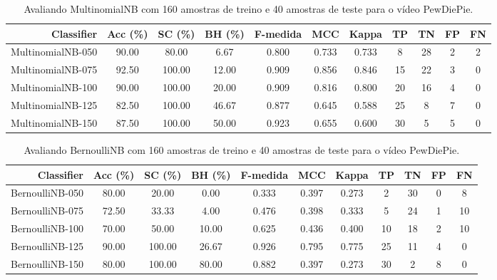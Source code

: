\begin{table}[!htb]
\centering
\caption{Avaliando MultinomialNB com 160 amostras de treino e 40 amostras de teste para o vídeo PewDiePie.}
\label{tab:multinomial-nb-PewDiePie}
\begin{tabular}{r|c|c|c|c|c|c|c|c|c|c}
\hline\hline
Classifier & Acc (\%) & SC (\%) & BH (\%) & F-medida & MCC & Kappa & TP & TN & FP & FN \\ \hline
MultinomialNB-050 & 90.00 & 80.00 & 6.67 & 0.800 & 0.733 & 0.733 & 8 & 28 & 2 & 2 \\ 
MultinomialNB-075 & 92.50 & 100.00 & 12.00 & 0.909 & 0.856 & 0.846 & 15 & 22 & 3 & 0 \\ 
MultinomialNB-100 & 90.00 & 100.00 & 20.00 & 0.909 & 0.816 & 0.800 & 20 & 16 & 4 & 0 \\ 
MultinomialNB-125 & 82.50 & 100.00 & 46.67 & 0.877 & 0.645 & 0.588 & 25 & 8 & 7 & 0 \\ 
MultinomialNB-150 & 87.50 & 100.00 & 50.00 & 0.923 & 0.655 & 0.600 & 30 & 5 & 5 & 0 \\ 
\hline\hline
\end{tabular}
\end{table}
\begin{table}[!htb]
\centering
\caption{Avaliando BernoulliNB com 160 amostras de treino e 40 amostras de teste para o vídeo PewDiePie.}
\label{tab:bernoulli-nb-PewDiePie}
\begin{tabular}{r|c|c|c|c|c|c|c|c|c|c}
\hline\hline
Classifier & Acc (\%) & SC (\%) & BH (\%) & F-medida & MCC & Kappa & TP & TN & FP & FN \\ \hline
BernoulliNB-050 & 80.00 & 20.00 & 0.00 & 0.333 & 0.397 & 0.273 & 2 & 30 & 0 & 8 \\ 
BernoulliNB-075 & 72.50 & 33.33 & 4.00 & 0.476 & 0.398 & 0.333 & 5 & 24 & 1 & 10 \\ 
BernoulliNB-100 & 70.00 & 50.00 & 10.00 & 0.625 & 0.436 & 0.400 & 10 & 18 & 2 & 10 \\ 
BernoulliNB-125 & 90.00 & 100.00 & 26.67 & 0.926 & 0.795 & 0.775 & 25 & 11 & 4 & 0 \\ 
BernoulliNB-150 & 80.00 & 100.00 & 80.00 & 0.882 & 0.397 & 0.273 & 30 & 2 & 8 & 0 \\ 
\hline\hline
\end{tabular}
\end{table}
